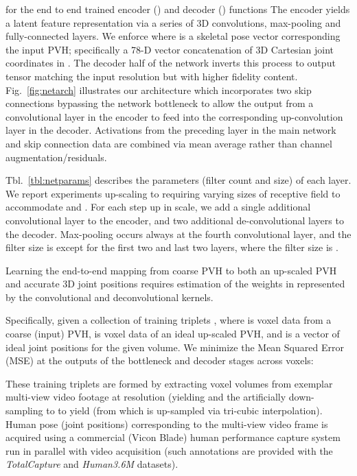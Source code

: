 \documentclass[runningheads]{llncs}
\begin{document}
for the end to end trained encoder () and decoder () functions  The encoder yields a latent feature representation via a series of 3D convolutions, max-pooling and fully-connected layers.  We enforce  where  is a skeletal pose vector corresponding the input PVH; specifically a 78-D vector concatenation of  3D Cartesian joint coordinates in .  The decoder half of the network inverts this process to output tensor  matching the input resolution but with higher fidelity content.
Fig.~\ref{fig:netarch} illustrates our architecture which incorporates two skip connections bypassing the network bottleneck to allow the output from a convolutional layer in the encoder to feed into the corresponding up-convolution layer in the decoder. Activations from the preceding layer in the main network and skip connection data are combined via mean average rather than channel augmentation/residuals. 

Tbl.~\ref{tbl:netparams} describes the parameters (filter count and size) of each layer.  We report experiments up-scaling to  requiring varying sizes of receptive field to accommodate  and .  For each step up in scale, we add a single additional convolutional layer to the encoder, and two additional de-convolutional layers to the decoder.  Max-pooling occurs always at the fourth convolutional layer, and the filter size is  except for the first two and last two layers, where the filter size is  .

Learning the end-to-end mapping from coarse PVH to both an up-scaled PVH and accurate 3D joint positions requires estimation of the weights  in  represented by the convolutional and deconvolutional kernels.

Specifically, given a collection of  training triplets , where  is voxel data from a coarse (input) PVH,  is voxel data of an ideal up-scaled PVH, and  is a vector of ideal joint positions for the given volume. We minimize the Mean Squared Error (MSE) at the outputs of the bottleneck and decoder stages across  voxels:


These training triplets are formed by extracting voxel volumes from exemplar multi-view video footage at resolution  (yielding  and the artificially down-sampling to   to yield  (from which  is up-sampled via tri-cubic interpolation).  Human pose (joint positions) corresponding to the multi-view video frame is acquired using a commercial (Vicon Blade) human performance capture system run in parallel with video acquisition (such annotations are provided with the {\em TotalCapture} and {\em Human3.6M} datasets).
\end{document}
